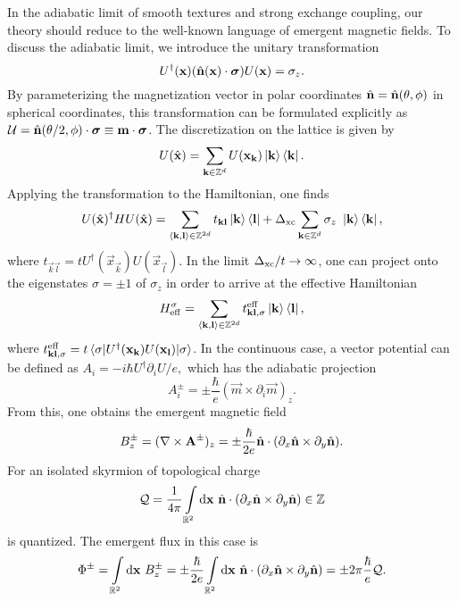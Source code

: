 \documentclass[
    aps,
    prb,
    twocolumn,
    floatfix,
    superscriptaddress,
	10pt
]{revtex4-2}
\begin{document}
In the adiabatic limit of smooth textures and strong exchange coupling, our theory should reduce to the well-known language of emergent magnetic fields.
To discuss the adiabatic limit, we introduce the unitary transformation
\begin{equation}
	U^\dagger(\mathbf{x}) ( \hat{\mathbf{n}}(\mathbf{x})\cdot \boldsymbol{\sigma} ) U(\mathbf{x})  = \sigma_z .
\end{equation}
By parameterizing the magnetization vector in polar coordinates $\hat{\mathbf{n}} = \hat{\mathbf{n}}(\theta, \phi)$ in spherical coordinates, this transformation can be formulated explicitly as $\mathcal{U} = \hat{\mathbf{n}}(\theta/2, \phi)\cdot \boldsymbol{\sigma} \equiv \mathbf{m} \cdot \boldsymbol{\sigma}$.
The discretization on the lattice is given by
\begin{equation}
	U( \hat{\mathbf{x}}) = \sum_{\mathbf{k} \in \mathbb{Z}^d} U( \mathbf{x}_{\mathbf{k}} )\ket{\mathbf{k}} \bra{\mathbf{k}} .
\end{equation}
Applying the transformation to the Hamiltonian, one finds
\begin{align}
	U( \hat{\mathbf{x}})^\dagger H  U( \hat{\mathbf{x}}) = \sum_{\braket{\mathbf{k},\mathbf{l}} \in \mathbb{Z}^{2d}} t_{\mathbf{k}\mathbf{l}} \ket{\mathbf{k}}\bra{\mathbf{l}}
	+ \Delta_\mathrm{xc}\sum_{\mathbf{k} \in \mathbb{Z}^d}  \sigma_z ~ \ket{\mathbf{k}}\bra{\mathbf{k}} ,
	\label{eq:hamiltonian}
\end{align}
where $t_{\vec{k}\vec{l}} = t U^\dagger(\vec{x}_\vec{k}) U(\vec{x}_\vec{l})$.
In the limit $\Delta_\mathrm{xc} / t \to \infty$, one can project onto the eigenstates $\sigma = \pm 1$ of $\sigma_z$ in order to arrive at the effective Hamiltonian
\begin{equation}
	H_\mathrm{eff}^\sigma
	= \sum_{\braket{\mathbf{k},\mathbf{l}} \in \mathbb{Z}^{2d}} t_{\mathbf{k}\mathbf{l}, \sigma}^{\mathrm{eff}} \ket{\mathbf{k}}\bra{\mathbf{l}},
\end{equation}
where
$
t_{\mathbf{k}\mathbf{l}, \sigma}^{\mathrm{eff}} =t  \braket{\sigma |  U^\dagger(\mathbf{x}_{\mathbf{k}}) U(\mathbf{x}_{\mathbf{l}})  | \sigma }
$.
In the continuous case, a vector potential can be defined as
$
A_i = - i \hbar U^\dagger \partial_i U  / e ,
$
which has the adiabatic projection
\begin{equation}
	A_i^{\pm} = \pm \frac{\hbar}{e} ( \vec{m} \times \partial_i \vec{m} )_z .
\end{equation}
From this, one obtains the emergent magnetic field
\begin{equation}
	B_z^\pm 
	= (\nabla \times \mathbf{A}^\pm)_z = \pm \frac{\hbar}{2 e} \hat{\mathbf{n}} \cdot (\partial_x \hat{\mathbf{n}} \times \partial_y \hat{\mathbf{n}}) .
\end{equation}
For an isolated skyrmion of topological charge 
\begin{equation}
	\mathcal{Q} = \frac{1}{4 \pi}\int\limits_{\mathbb{R}^2} \mathrm{d} \mathbf{x}~ \hat{\mathbf{n}} \cdot (\partial_x \hat{\mathbf{n}} \times \partial_y \hat{\mathbf{n}}) \in \mathbb{Z}
\end{equation}
is quantized.
The emergent flux in this case is
\begin{equation}
	\Phi^\pm = \int\limits_{\mathbb{R}^2} \mathrm{d} \mathbf{x}~ B_z^\pm 
	=\pm \frac{\hbar}{2 e} \int\limits_{\mathbb{R}^2} \mathrm{d} \mathbf{x}~ \hat{\mathbf{n}} \cdot (\partial_x \hat{\mathbf{n}} \times \partial_y \hat{\mathbf{n}})
	=\pm 2 \pi \frac{\hbar}{ e}  \mathcal{Q} .
\end{equation}
\end{document}
